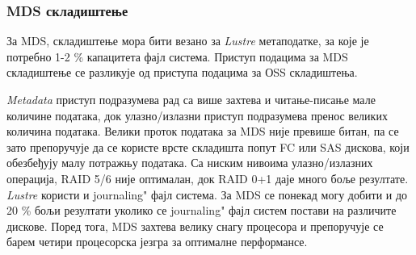 \subsubsection{MDS складиштење}
За MDS, складиштење мора бити везано за \textit{Lustre} метаподатке, за које је потребно 1-2 \% капацитета фајл система. Приступ подацима за MDS складиштење се разликује од приступа подацима за ОSS складиштења. 

\textit{Metadata} приступ подразумева рад са више захтева и читање-писање мале количине података, док улазно/излазни приступ подразумева пренос великих количина података. Велики проток података за MDS није превише битан, па се зато препоручује да се користе врсте складишта попут FC или SAS дискова, који обезбеђују малу потражњу података. Са ниским нивоима улазно/излазних операција, RAID 5/6 није оптималан, док RAID 0+1 даје много боље резултате. \textit{Lustre} користи и \zn journaling" фајл система. За MDS се понекад могу добити и до 20 \%  бољи резултати уколико се  \zn journaling" фајл систем постави на различите дискове. Поред тога, MDS захтева велику снагу процесора и препоручује се барем четири процесорска језгра за оптималне перформансе.



